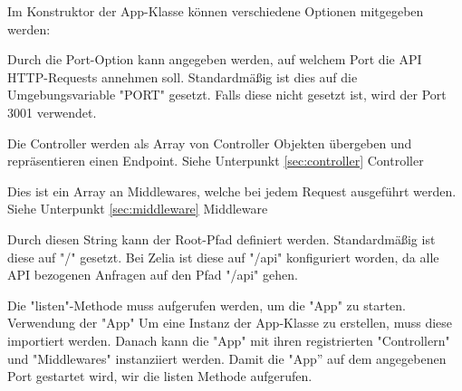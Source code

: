 
Im Konstruktor der App-Klasse können verschiedene Optionen mitgegeben werden:


Durch die Port-Option kann angegeben werden, auf welchem Port die API HTTP-Requests annehmen soll. Standardmäßig ist dies auf die Umgebungsvariable "PORT" gesetzt. Falls diese nicht gesetzt ist, wird der Port 3001 verwendet.


Die Controller werden als Array von Controller Objekten übergeben und repräsentieren einen Endpoint. Siehe Unterpunkt \ref{sec:controller} Controller


Dies ist ein Array an Middlewares, welche bei jedem Request ausgeführt werden. Siehe Unterpunkt \ref{sec:middleware} Middleware


Durch diesen String kann der Root-Pfad definiert werden. Standardmäßig ist diese auf "/" gesetzt. Bei Zelia ist diese auf "/api" konfiguriert worden, da alle API bezogenen Anfragen auf den Pfad "/api" gehen.

Die "listen"-Methode muss aufgerufen werden, um die "App" zu starten.
Verwendung der "App"
Um eine Instanz der App-Klasse zu erstellen, muss diese importiert werden. Danach kann die "App" mit ihren registrierten "Controllern" und "Middlewares" instanziiert werden. Damit die "App” auf dem angegebenen Port gestartet wird, wir die listen Methode aufgerufen.

